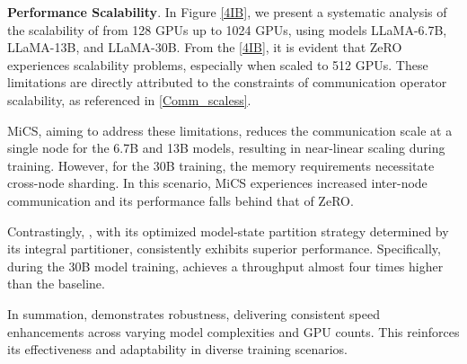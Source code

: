 \noindent\textbf{Performance Scalability}.
In Figure \ref{4IB}, we present a systematic analysis of the scalability of \SysName from 128 GPUs up to 1024 GPUs, using models LLaMA-6.7B, LLaMA-13B, and LLaMA-30B. From the \ref{4IB}, it is evident that ZeRO experiences scalability problems, especially when scaled to 512 GPUs. These limitations are directly attributed to the constraints of communication operator scalability, as referenced in \ref{Comm_scaless}. 

MiCS, aiming to address these limitations, reduces the communication scale at a single node for the 6.7B and 13B models, resulting in near-linear scaling during training. However, for the 30B training, the memory requirements necessitate cross-node sharding. In this scenario, MiCS experiences increased inter-node communication and its performance falls behind that of ZeRO.

Contrastingly, \SysName, with its optimized model-state partition strategy determined by its integral partitioner, consistently exhibits superior performance. Specifically, during the 30B model training, \SysName achieves a throughput almost four times higher than the baseline.

In summation, \SysName demonstrates robustness, delivering consistent speed enhancements across varying model complexities and GPU counts. This reinforces its effectiveness and adaptability in diverse training scenarios.

